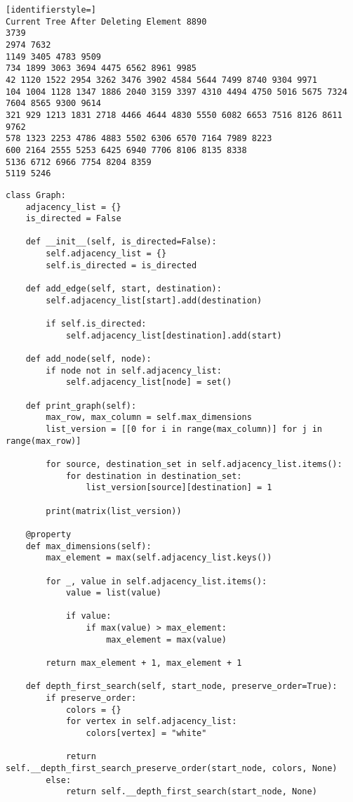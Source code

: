 \documentclass[12pt]{scrartcl}
\begin{document}
\begin{lstlisting}[identifierstyle=]
Current Tree After Deleting Element 8890
3739
2974 7632
1149 3405 4783 9509
734 1899 3063 3694 4475 6562 8961 9985
42 1120 1522 2954 3262 3476 3902 4584 5644 7499 8740 9304 9971
104 1004 1128 1347 1886 2040 3159 3397 4310 4494 4750 5016 5675 7324 7604 8565 9300 9614
321 929 1213 1831 2718 4466 4644 4830 5550 6082 6653 7516 8126 8611 9762
578 1323 2253 4786 4883 5502 6306 6570 7164 7989 8223
600 2164 2555 5253 6425 6940 7706 8106 8135 8338
5136 6712 6966 7754 8204 8359
5119 5246
\end{lstlisting}

\problem{}
\begin{lstlisting}
class Graph:
    adjacency_list = {}
    is_directed = False

    def __init__(self, is_directed=False):
        self.adjacency_list = {}
        self.is_directed = is_directed

    def add_edge(self, start, destination):
        self.adjacency_list[start].add(destination)

        if self.is_directed:
            self.adjacency_list[destination].add(start)

    def add_node(self, node):
        if node not in self.adjacency_list:
            self.adjacency_list[node] = set()

    def print_graph(self):
        max_row, max_column = self.max_dimensions
        list_version = [[0 for i in range(max_column)] for j in range(max_row)]

        for source, destination_set in self.adjacency_list.items():
            for destination in destination_set:
                list_version[source][destination] = 1

        print(matrix(list_version))

    @property
    def max_dimensions(self):
        max_element = max(self.adjacency_list.keys())

        for _, value in self.adjacency_list.items():
            value = list(value)

            if value:
                if max(value) > max_element:
                    max_element = max(value)

        return max_element + 1, max_element + 1

    def depth_first_search(self, start_node, preserve_order=True):
        if preserve_order:
            colors = {}
            for vertex in self.adjacency_list:
                colors[vertex] = "white"

            return self.__depth_first_search_preserve_order(start_node, colors, None)
        else:
            return self.__depth_first_search(start_node, None)


\end{lstlisting}
\end{document}
